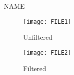 \documentclass[landscape]{article}
\begin{document}
\pagestyle{empty}

\centering
NAME \\
\begin{figure}
\noindent\begin{minipage}{.5\linewidth}
  \centering
  \texttt{[image: FILE1]}
  \caption{Unfiltered}
  \label{fig:testfig1}
\end{minipage}
\begin{minipage}{.5\linewidth}
  \centering
  \texttt{[image: FILE2]}
  \caption{Filtered}
  \label{fig:testfig2}
\end{minipage}
\end{figure}
\end{document}
